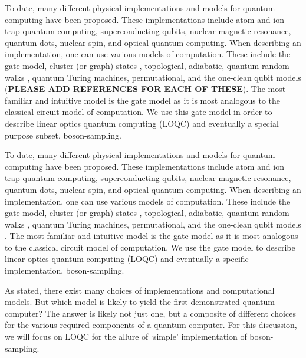 \documentclass[aps,pra,twocolumn,amsmath,amssymb,nofootinbib,superscriptaddress]{revtex4}
\begin{document}
To-date, many different physical implementations and models for quantum computing have been proposed. These implementations include atom and ion trap quantum computing, superconducting qubits, nuclear magnetic resonance, quantum dots, nuclear spin, and optical quantum computing. When describing an implementation, one can use various models of computation. These include the gate model, cluster (or graph) states \cite{bib:Raussendorf01, bib:Raussendorf03}, topological, adiabatic, quantum random walks \cite{bib:ADZ}, quantum Turing machines, permutational, and the one-clean qubit models (\textbf{PLEASE ADD REFERENCES FOR EACH OF THESE}). The most familiar and intuitive model is the gate model as it is most analogous to the classical circuit model of computation. We use this gate model in order to describe linear optics quantum computing (LOQC) and eventually a special purpose subset, boson-sampling.

To-date, many different physical implementations and models for quantum computing have been proposed. These implementations include atom and ion trap quantum computing, superconducting qubits, nuclear magnetic resonance, quantum dots, nuclear spin, and optical quantum computing. When describing an implementation, one can use various models of computation. These include the gate model, cluster (or graph) states \cite{bib:Raussendorf01, bib:Raussendorf03}, topological, adiabatic, quantum random walks \cite{bib:ADZ}, quantum Turing machines, permutational, and the one-clean qubit models \cite{jordan}. The most familiar and intuitive model is the gate model as it is most analogous to the classical circuit model of computation. We use the gate model to describe linear optics quantum computing (LOQC) and eventually a specific implementation, boson-sampling.

As stated, there exist many choices of implementations and computational models. But which model is likely to yield the first demonstrated quantum computer? The answer is likely not just one, but a composite of different choices for the various required components of a quantum computer. For this discussion, we will focus on LOQC for the allure of `simple' implementation of boson-sampling.
\end{document}
